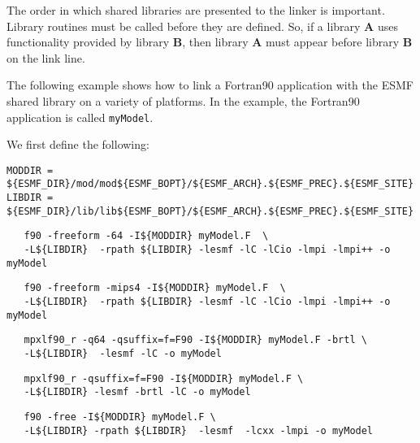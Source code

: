 The order in which shared libraries are presented to 
the linker is important. Library routines must be called before they are 
defined. So, if a library {\bf A} uses functionality provided by library 
{\bf B}, then library {\bf A} must appear before library {\bf B} on the link line. 

The following example shows how to link a Fortran90 
application with the ESMF shared library on a variety of platforms.  
In the example, the Fortran90 application is called {\tt myModel}.

\noindent We first define the following:

\begin{verbatim}
MODDIR = ${ESMF_DIR}/mod/mod${ESMF_BOPT}/${ESMF_ARCH}.${ESMF_PREC}.${ESMF_SITE}
LIBDIR = ${ESMF_DIR}/lib/lib${ESMF_BOPT}/${ESMF_ARCH}.${ESMF_PREC}.${ESMF_SITE}
\end{verbatim}


\begin{verbatim}
   f90 -freeform -64 -I${MODDIR} myModel.F  \
   -L${LIBDIR}  -rpath ${LIBDIR} -lesmf -lC -lCio -lmpi -lmpi++ -o myModel  
\end{verbatim}


\begin{verbatim}
   f90 -freeform -mips4 -I${MODDIR} myModel.F  \
   -L${LIBDIR}  -rpath ${LIBDIR} -lesmf -lC -lCio -lmpi -lmpi++ -o myModel  
\end{verbatim}


\begin{verbatim}
   mpxlf90_r -q64 -qsuffix=f=F90 -I${MODDIR} myModel.F -brtl \
   -L${LIBDIR}  -lesmf -lC -o myModel
\end{verbatim}


\begin{verbatim}
   mpxlf90_r -qsuffix=f=F90 -I${MODDIR} myModel.F \
   -L${LIBDIR} -lesmf -brtl -lC -o myModel
\end{verbatim}


\begin{verbatim}
   f90 -free -I${MODDIR} myModel.F \
   -L${LIBDIR} -rpath ${LIBDIR}  -lesmf  -lcxx -lmpi -o myModel
\end{verbatim}


